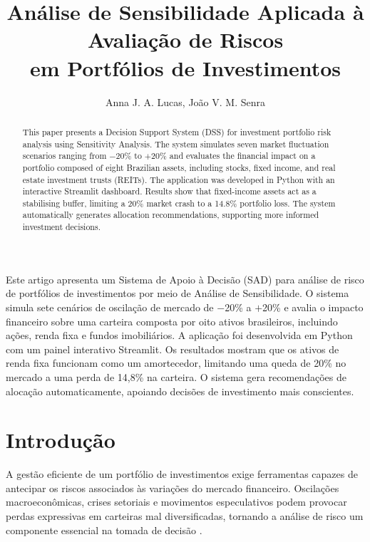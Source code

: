 \documentclass[12pt]{article}
\title{Análise de Sensibilidade Aplicada à Avaliação de Riscos\\
       em Portfólios de Investimentos}
\author{Anna J. A. Lucas\inst{1}, João V. M. Senra\inst{2}}
\begin{document}
\maketitle

\begin{abstract}
This paper presents a Decision Support System (DSS) for investment portfolio risk
analysis using Sensitivity Analysis. The system simulates seven market fluctuation
scenarios ranging from $-$20\% to $+$20\% and evaluates the financial impact on a
portfolio composed of eight Brazilian assets, including stocks, fixed income, and real
estate investment trusts (REITs). The application was developed in Python with an
interactive Streamlit dashboard. Results show that fixed-income assets act as a
stabilising buffer, limiting a 20\% market crash to a 14.8\% portfolio loss. The system
automatically generates allocation recommendations, supporting more informed investment
decisions.
\end{abstract}

\begin{resumo}
Este artigo apresenta um Sistema de Apoio à Decisão (SAD) para análise de risco de
portfólios de investimentos por meio de Análise de Sensibilidade. O sistema simula sete
cenários de oscilação de mercado de $-$20\% a $+$20\% e avalia o impacto financeiro
sobre uma carteira composta por oito ativos brasileiros, incluindo ações, renda fixa e
fundos imobiliários. A aplicação foi desenvolvida em Python com um painel interativo
Streamlit. Os resultados mostram que os ativos de renda fixa funcionam como um
amortecedor, limitando uma queda de 20\% no mercado a uma perda de 14,8\% na carteira.
O sistema gera recomendações de alocação automaticamente, apoiando decisões de
investimento mais conscientes.
\end{resumo}

\section{Introdução}

A gestão eficiente de um portfólio de investimentos exige ferramentas capazes de
antecipar os riscos associados às variações do mercado financeiro. Oscilações
macroeconômicas, crises setoriais e movimentos especulativos podem provocar perdas
expressivas em carteiras mal diversificadas, tornando a análise de risco um componente
essencial na tomada de decisão \cite{markowitz1952}.
\end{document}
